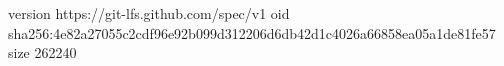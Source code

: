 version https://git-lfs.github.com/spec/v1
oid sha256:4e82a27055c2cdf96e92b099d312206d6db42d1c4026a66858ea05a1de81fe57
size 262240
